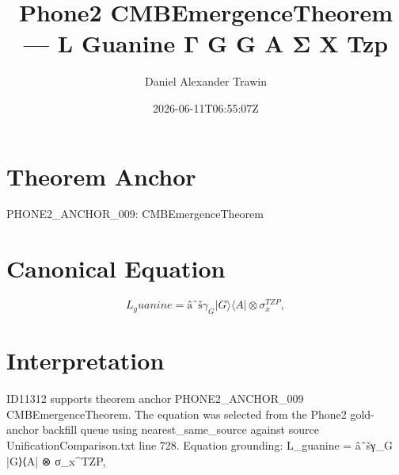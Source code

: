 \documentclass[11pt]{article}
\title{Phone2 CMBEmergenceTheorem — L Guanine Γ G G A Σ X Tzp}
\author{Daniel Alexander Trawin}
\date{2026-06-11T06:55:07Z}
\begin{document}
\maketitle
\section*{Theorem Anchor}
PHONE2_ANCHOR_009: CMBEmergenceTheorem
\section*{Canonical Equation}
\[
L_guanine = âˆšγ_G |G⟩⟨A| ⊗ σ_x^{TZP},
\]
\section*{Interpretation}
ID11312 supports theorem anchor PHONE2_ANCHOR_009 CMBEmergenceTheorem. The equation was selected from the Phone2 gold-anchor backfill queue using nearest_same_source against source UnificationComparison.txt line 728. Equation grounding: L_guanine = âˆšγ_G |G⟩⟨A| ⊗ σ_x^{TZP},
\end{document}
